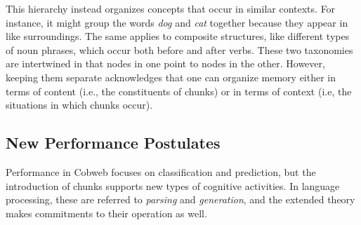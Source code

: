 \documentclass[11pt,letterpaper]{article}
\begin{document}
\vskip 0.02in
\noindent
This hierarchy instead organizes concepts that occur in similar
contexts. For instance, it might group the words {\sl dog} and
{\sl cat} together because they appear in like surroundings.
The same applies to composite structures, like different
types of noun phrases, which occur both before and after verbs.
These two taxonomies are intertwined in that nodes in one point
to nodes in the other. However, keeping them separate acknowledges 
that one can organize memory either in terms of content (i.e.,
the constituents of chunks) or in terms of context (i.e, the
situations in which chunks occur).



\subsection{New Performance Postulates}

Performance in Cobweb focuses on classification and prediction,
but the introduction of chunks supports new types of cognitive
activities. In language processing, these are referred to {\it                  
parsing\/} and {\it generation\/}, and the extended theory makes
commitments to their operation as well.



\end{document}

